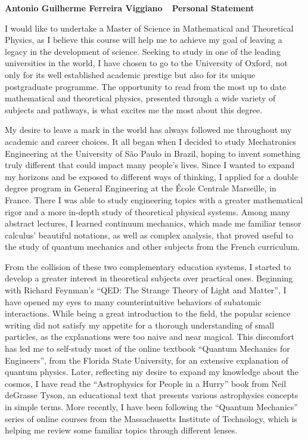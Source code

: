 \documentclass[10pt]{article}
\def\firstname{Antonio Guilherme }
\def\familyname{Ferreira Viggiano}
\def\FileTitle{\firstname\familyname~\textemdash~Personal Statement}
\newcommand*{\NEWLINE}{\vspace{0.75em}}
\begin{document}
\sffamily %

{\bfseries \FileTitle}
\NEWLINE{}

I would like to undertake a Master of Science in Mathematical and Theoretical Physics, as I believe this course will help me to achieve my goal of leaving a legacy in the development of science. Seeking to study in one of the leading universities in the world, I have chosen to go to the University of Oxford, not only for its well established academic prestige but also for its unique postgraduate programme. The opportunity to read from the most up to date mathematical and theoretical physics, presented through a wide variety of subjects and pathways, is what excites me the most about this degree. \NEWLINE{}

My desire to leave a mark in the world has always followed me throughout my academic and career choices. It all began when I decided to study Mechatronics Engineering at the University of São Paulo in Brazil, hoping to invent something truly different that could impact many people's lives. Since I wanted to expand my horizons and be exposed to different ways of thinking, I applied for a double degree program in General Engineering at the École Centrale Marseille, in France. There I was able to study engineering topics with a greater mathematical rigor and a more in-depth study of theoretical physical systems. Among many abstract lectures, I learned continuum mechanics, which made me familiar tensor calculus' beautiful notations, as well as complex analysis, that proved useful to the study of quantum mechanics and other subjects from the French curriculum. \NEWLINE{}

From the collision of these two complementary education systems, I started to develop a greater interest in theoretical subjects over practical ones. Beginning with Richard Feynman's ``QED: The Strange Theory of Light and Matter'', I have opened my eyes to many counterintuitive behaviors of subatomic interactions. While being a great introduction to the field, the popular science writing did not satisfy my appetite for a thorough understanding of small particles, as the explanations were too naive and near magical. This discomfort has led me to self-study most of the online textbook ``Quantum Mechanics for Engineers'', from the Florida State University, for an extensive explanation of quantum physics. Later, reflecting my desire to expand my knowledge about the cosmos, I have read the ``Astrophysics for People in a Hurry'' book from Neil deGrasse Tyson, an educational text that presents various astrophysics concepts in simple terms. More recently, I have been following the ``Quantum Mechanics'' series of online courses from the Massachusetts Institute of Technology, which is helping me review some familiar topics through different lenses.
\NEWLINE{}
\end{document}

